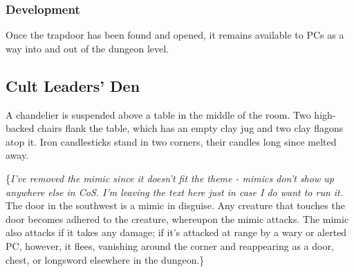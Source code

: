 \subsubsection*{Development}
Once the trapdoor has been found and opened, it remains available to PCs as a way into and out of the
dungeon level.

\begin{arealinks}
\end{arealinks}


\pagebreak
\subsection{Cult Leaders' Den}
\label{sec:CultLeadersDen}
\begin{readout}
  A chandelier is suspended above a table in the middle of the room. Two high-backed chairs flank the table,
  which has an empty clay jug and two clay flagons atop it. Iron candlesticks stand in two corners, their
  candles long since melted away.
\end{readout}
\{\textit{I've removed the mimic since it doesn't fit the theme - mimics don't show up anywhere else in CoS. I'm 
leaving the text here just in case I do want to run it.}
The door in the southwest is a mimic in disguise. Any creature that touches the door becomes adhered to the
creature, whereupon the mimic attacks. The mimic also attacks if it takes any damage; if it's attacked at
range by a wary or alerted PC, however, it flees, vanishing around the corner and reappearing as a door,
chest, or longsword elsewhere in the dungeon.\}

\begin{arealinks}
\end{arealinks}


\pagebreak
